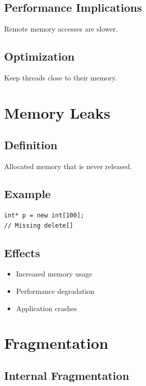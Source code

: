 \subsection{Performance Implications}

Remote memory accesses are slower.

\subsection{Optimization}

Keep threads close to their memory.

\section{Memory Leaks}

\subsection{Definition}

Allocated memory that is never released.

\subsection{Example}

\begin{verbatim}
int* p = new int[100];
// Missing delete[]
\end{verbatim}

\subsection{Effects}

\begin{itemize}
\item Increased memory usage
\item Performance degradation
\item Application crashes
\end{itemize}

\section{Fragmentation}

\subsection{Internal Fragmentation}

